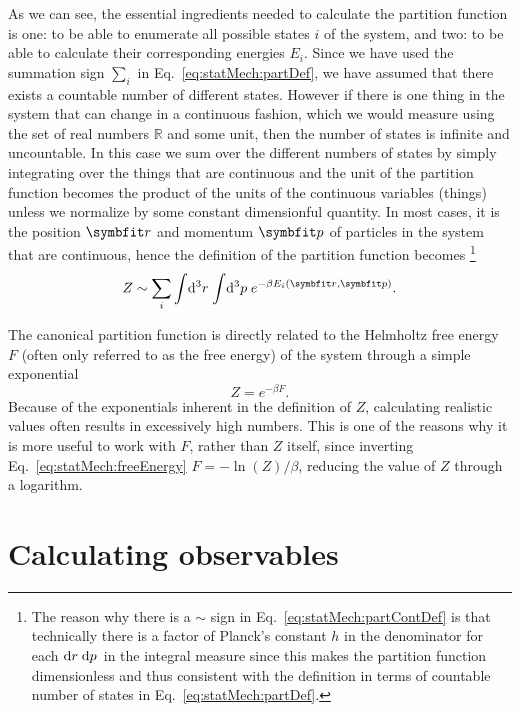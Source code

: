 As we can see, the essential ingredients needed to calculate the partition function is one: to be able to
enumerate all possible states $i$ of the system, and two: to be able to calculate their corresponding energies $E_i$.
Since we have used the summation sign $\sum_i$ in Eq.~\eqref{eq:statMech:partDef}, we have 
assumed that there exists a countable number of different states. However if there is one thing in the
system that can change in a continuous fashion, which we would measure using the set of real numbers
$\mathbb{R}$ and some unit, then the number of states is infinite and uncountable. In this case we sum over the
different numbers of states by simply integrating over the things that are continuous and the unit
of the partition function becomes the product of the units of the continuous variables (things) unless
we normalize by some constant dimensionful quantity.
In most cases, it is the position $\v{r}$ and momentum $\v{p}$ of particles in the system that are continuous, hence
the definition of the partition function becomes%
\footnote{The reason why there is a $\sim$ sign in Eq.~\eqref{eq:statMech:partContDef} is that technically there is a factor
of Planck's constant $h$ in the denominator for each $\mathop{\textrm{d}\kern0emr\kern0.1em}\mathop{\textrm{d}\kern0emp\kern0.1em}$ in the integral measure since this makes the partition function
dimensionless and thus consistent with the definition in terms of countable number of states in Eq.~\eqref{eq:statMech:partDef}.}
\begin{equation}
    Z \sim \sum_i\sint\d{^3r}\sint\d{^3p} e^{-\beta E_i(\v{r},\v{p})}.
    \label{eq:statMech:partContDef}
\end{equation}

The canonical partition function is directly related to the Helmholtz free energy $F$ (often only referred to
as the free energy) of the system through a simple exponential
\begin{equation}
    \label{eq:statMech:freeEnergy}
    Z = e^{-\beta F}.
\end{equation}
Because of the exponentials inherent in the definition of $Z$, calculating realistic values often results
in excessively high numbers. This is one of the reasons why it is more useful to work with $F$, rather than $Z$ itself,
since inverting Eq.~\eqref{eq:statMech:freeEnergy} $F = -\ln(Z)/\beta$, reducing the value of $Z$ through
a logarithm.

\section{Calculating observables}

